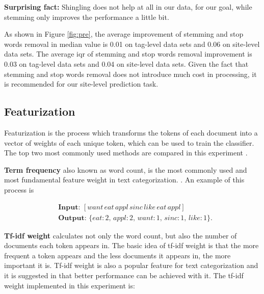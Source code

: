 \documentclass{sig-alternate-05-2015}
\begin{document}


\textbf{Surprising fact:} Shingling does not help at all in our data, for our goal, while stemming only improves the performance a little bit. 

As shown in Figure \ref{fig:pre}, the average improvement of stemming and stop words removal in median value is 0.01 on tag-level data sets and 0.06 on site-level data sets. The average iqr of stemming and stop words removal improvement is 0.03 on tag-level data sets and 0.04 on site-level data sets. Given the fact that stemming and stop words removal does not introduce much cost in processing, it is recommended for our site-level prediction task.

\subsection{Featurization}

Featurization is the process which transforms the tokens of each document into a vector of weights of each unique token, which can be used to train the classifier. The top two most commonly used methods are compared in this experiment \cite{manning1999foundations}. 

\textbf{Term frequency }also known as word count, is the most commonly used and most fundamental feature weight in text categorization. \cite{manning1999foundations}. An example of this process is 

\begin{equation*}
\begin{aligned}
    &\textbf{Input: }[want\, eat\, appl\, sinc\, like\, eat\, appl]\\
    &\textbf{Output: }\{eat: 2,\, appl: 2,\, want: 1,\, sinc: 1,\,like: 1\}.
\end{aligned}
\end{equation*}

\textbf{Tf-idf weight }calculates not only the word count, but also the number of documents each token appears in. The basic idea of tf-idf weight is that the more frequent a token appears and the less documents it appears in, the more important it is. Tf-idf weight is also a popular feature for text categorization\cite{caropreso2001learner} and it is suggested in \cite{moharanatag} that better performance can be achieved with it. The tf-idf weight implemented in this experiment is:
\end{document}
